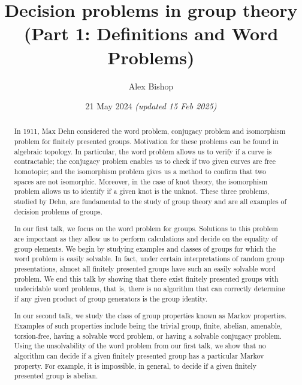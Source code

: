 \documentclass[11pt,a4paper,reqno]{amsart}
\theoremstyle{plain}
\theoremstyle{definition}
\theoremstyle{definition}
\begin{document}
\title{Decision problems in group theory\\(Part 1: Definitions and Word Problems)}
\author{Alex Bishop}
\date{21 May 2024 \textit{(updated 15 Feb 2025)}}
\address{%
	Section de mathématiques\\
	Université de Genève\\
	rue du Conseil-Général~7-9\\
	1205 Genève, Switzerland}

\begin{abstract}
	In 1911, Max Dehn considered the word problem, conjugacy problem and isomorphism problem for finitely presented groups. Motivation for these problems can be found in algebraic topology. In particular, the word problem allows us to verify if a curve is contractable; the conjugacy problem enables us to check if two given curves are free homotopic; and the isomorphism problem gives us a method to confirm that two spaces are not isomorphic. Moreover, in the case of knot theory, the isomorphism problem allows us to identify if a given knot is the unknot. These three problems, studied by Dehn, are fundamental to the study of group theory and are all examples of decision problems of groups.

	In our first talk, we focus on the word problem for groups. Solutions to this problem are important as they allow us to perform calculations and decide on the equality of group elements. We begin by studying examples and classes of groups for which the word problem is easily solvable. In fact, under certain interpretations of random group presentations, almost all finitely presented groups have such an easily solvable word problem. We end this talk by showing that there exist finitely presented groups with undecidable word problems, that is, there is no algorithm that can correctly determine if any given product of group generators is the group identity.

	In our second talk, we study the class of group properties known as Markov properties. Examples of such properties include being the trivial group, finite, abelian, amenable, torsion-free, having a solvable word problem, or having a solvable conjugacy problem. Using the unsolvability of the word problem from our first talk, we show that no algorithm can decide if a given finitely presented group has a particular Markov property. For example, it is impossible, in general, to decide if a given finitely presented group is abelian.
\end{abstract}
\maketitle
\end{document}
